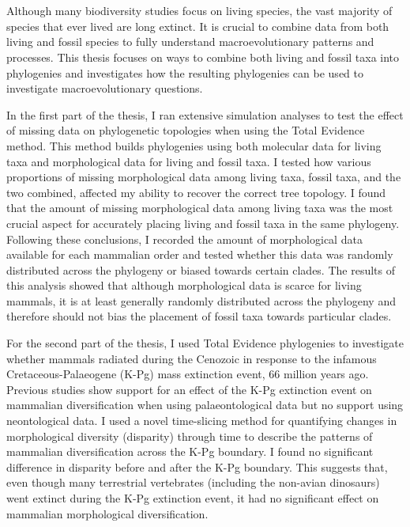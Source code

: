 \documentclass[a4paper,11pt]{article}
\begin{document}
\begin{center}

\\
\bigskip
\\

\end{center}
Although many biodiversity studies focus on living species, the vast majority of species that ever lived are long extinct.
It is crucial to combine data from both living and fossil species to fully understand macroevolutionary patterns and processes.
This thesis focuses on ways to combine both living and fossil taxa into phylogenies and investigates how the resulting phylogenies can be used to investigate macroevolutionary questions.

In the first part of the thesis, I ran extensive simulation analyses to test the effect of missing data on phylogenetic topologies when using the Total Evidence method.
This method builds phylogenies using both molecular data for living taxa and morphological data for living and fossil taxa.
I tested how various proportions of missing morphological data among living taxa, fossil taxa, and the two combined, affected my ability to recover the correct tree topology.
I found that the amount of missing morphological data among living taxa was the most crucial aspect for accurately placing living and fossil taxa in the same phylogeny.
Following these conclusions, I recorded the amount of morphological data available for each mammalian order and tested whether this data was randomly distributed across the phylogeny or biased towards certain clades.
The results of this analysis showed that although morphological data is scarce for living mammals, it is at least generally randomly distributed across the phylogeny and therefore should not bias the placement of fossil taxa towards particular clades.

For the second part of the thesis, I used Total Evidence phylogenies to investigate whether mammals radiated during the Cenozoic in response to the infamous Cretaceous-Palaeogene (K-Pg) mass extinction event, 66 million years ago.
Previous studies show support for an effect of the K-Pg extinction event on mammalian diversification when using palaeontological data but no support using neontological data.
I used a novel time-slicing method for quantifying changes in morphological diversity (disparity) through time to describe the patterns of mammalian diversification across the K-Pg boundary.
I found no significant difference in disparity before and after the K-Pg boundary.
This suggests that, even though many terrestrial vertebrates (including the non-avian dinosaurs) went extinct during the K-Pg extinction event, it had no significant effect on mammalian morphological diversification.
\end{document}
